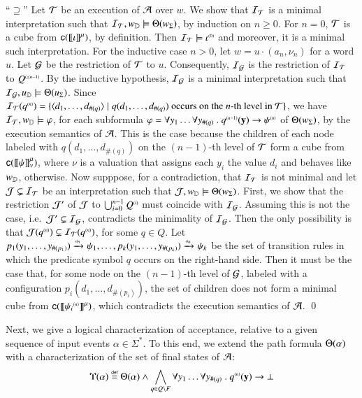 \documentclass{llncs}
\begin{document}
{  ``$\supseteq$'' Let $\mathcal{T}$ be an execution of $\mathcal{A}$ over $w$. We show
  that $\mathcal{I}_{\mathcal{T}}$ is a minimal interpretation such that $\mathcal{I}_{\mathcal{T}},
  w_{\mathbb{D}} \models \Theta({w_\Sigma})$, by induction on $n \geq
  0$. For $n=0$, $\mathcal{T}$ is a cube from $\mathsf{c}({{\bf [\![} \iota {\bf ]\!]}^\mu})$, by
  definition. Then $\mathcal{I}_{\mathcal{T}} \models {\iota}^{\scriptscriptstyle{({0})}}$ and moreover, it
  is a minimal such interpretation. For the inductive case $n > 0$,
  let $w=u\cdot(a_n,\nu_n)$ for a word $u$. Let $\mathcal{G}$ be the
  restriction of $\mathcal{T}$ to $u$. Consequently, $\mathcal{I}_{\mathcal{G}}$ is the restriction
  of $\mathcal{I}_{\mathcal{T}}$ to ${Q}^{\scriptscriptstyle{({\leq n-1})}}$. By the inductive hypothesis,
  $\mathcal{I}_{\mathcal{G}}$ is a minimal interpretation such that \(\mathcal{I}_{\mathcal{G}}, u_{\mathbb{D}}
  \models \Theta({u_\Sigma})\). Since $\mathcal{I}_{\mathcal{T}}({q}^{\scriptscriptstyle{({n})}}) =
  \{ \langle d_1,\ldots,d_{\#(q)} \rangle \mid q(d_1,\ldots,d_{\#(q)})
    \text{ occurs on the $n$-th level in $\mathcal{T}$} \}$, we have $\mathcal{I}_{\mathcal{T}},
  w_{\mathbb{D}} \models \varphi$, for each subformula $\varphi = \forall y_1
  \ldots \forall y_{\#(q)} ~.~ {q}^{\scriptscriptstyle{({n-1})}}(\mathbf y)
  \rightarrow {\psi}^{\scriptscriptstyle{({n})}}$ of $\Theta({w_\Sigma})$, by the
  execution semantics of $\mathcal{A}$. This is the case because the children
  of each node labeled with $q(d_1,\ldots,d_{\#(q)})$ on the
  $(n-1)$-th level of $\mathcal{T}$ form a cube from
  $\mathsf{c}({{\bf [\![} \psi {\bf ]\!]}^\mu_\nu})$, where $\nu$ is a valuation that assigns
  each $y_i$ the value $d_i$ and behaves like $w_{\mathbb{D}}$,
  otherwise. Now supppose, for a contradiction, that $\mathcal{I}_{\mathcal{T}}$ is not
  minimal and let $\mathcal{J} \subsetneq \mathcal{I}_{\mathcal{T}}$ be an interpretation such
  that $\mathcal{J},w_{\mathbb{D}} \models \Theta({w_\Sigma})$. First, we show that
  the restriction $\mathcal{J}'$ of $\mathcal{J}$ to $\bigcup_{i=0}^{n-1} {Q}^{\scriptscriptstyle{({i})}}$
  must coincide with $\mathcal{I}_{\mathcal{G}}$. Assuming this is not the case,
  i.e.\ $\mathcal{J}' \subsetneq \mathcal{I}_{\mathcal{G}}$, contradicts the minimality of
  $\mathcal{I}_{\mathcal{G}}$. Then the only possibility is that $\mathcal{J}({q}^{\scriptscriptstyle{({n})}})
  \subsetneq \mathcal{I}_{\mathcal{T}}({q}^{\scriptscriptstyle{({n})}})$, for some $q \in Q$. Let
  $p_1(y_1,\ldots,y_{\#(p_1)}) \xrightarrow{{\scriptscriptstyle a_n}}_{{\scriptstyle }} \psi_1, \ldots,
  p_k(y_1,\ldots,y_{\#(p_k)}) \xrightarrow{{\scriptscriptstyle a_n}}_{{\scriptstyle }} \psi_k$ be the set of
  transition rules in which the predicate symbol $q$ occurs on the
  right-hand side. Then it must be the case that, for some node on the
  $(n-1)$-th level of $\mathcal{G}$, labeled with a configuration
  $p_i(d_1,\ldots,d_{\#(p_i)})$, the set of children does not form a
  minimal cube from $\mathsf{c}({{\bf [\![} {\psi_i}^{\scriptscriptstyle{({n})}} {\bf ]\!]}^\mu})$, which
  contradicts the execution semantics of $\mathcal{A}$. \qed}

Next, we give a logical characterization of acceptance, relative to a
given sequence of input events $\alpha \in \Sigma^*$. To this end, we
extend the path formula $\Theta({\alpha})$ with a characterization of
the set of final states of $\mathcal{A}$: 
\begin{equation}\label{eq:accform}
\Upsilon({\alpha}) \stackrel{\scriptscriptstyle{\mathsf{def}}}{=} \Theta({\alpha}) \wedge \bigwedge_{q
  \in Q \setminus F} \forall y_1 \ldots \forall y_{\#(q)} ~.~
{q}^{\scriptscriptstyle{({n})}}(\mathbf y) \rightarrow \bot
\end{equation}
\end{document}

